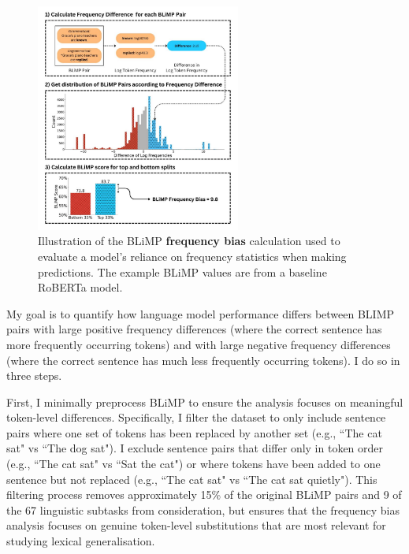 \begin{figure}
    \centering
    \includegraphics[width=0.6\textwidth]{chapters/syntatic-smoothing/figures/blimp_bias_example.pdf}
    \caption{Illustration of the BLiMP \textbf{frequency bias} calculation used to evaluate a model's reliance on frequency statistics when making predictions. The example BLiMP values are from a baseline RoBERTa model.}
    \label{fig:blimp_bias}
    \vspace{-1em}
\end{figure}

My goal is to quantify how language model performance differs between BLIMP pairs with large positive frequency differences (where the correct sentence has more frequently occurring tokens) and with large negative frequency differences (where the correct sentence has much less frequently occurring tokens). I do so in three steps.

First, I minimally preprocess BLiMP to ensure the analysis focuses on meaningful token-level differences. Specifically, I filter the dataset to only include sentence pairs where one set of tokens has been replaced by another set (e.g., ``The cat sat" vs ``The dog sat"). I exclude sentence pairs that differ only in token order (e.g., ``The cat sat" vs ``Sat the cat") or where tokens have been added to one sentence but not replaced (e.g., ``The cat sat" vs ``The cat sat quietly"). This filtering process removes approximately 15\% of the original BLiMP pairs and 9 of the 67 linguistic subtasks from consideration, but ensures that the frequency bias analysis focuses on genuine token-level substitutions that are most relevant for studying lexical generalisation.

